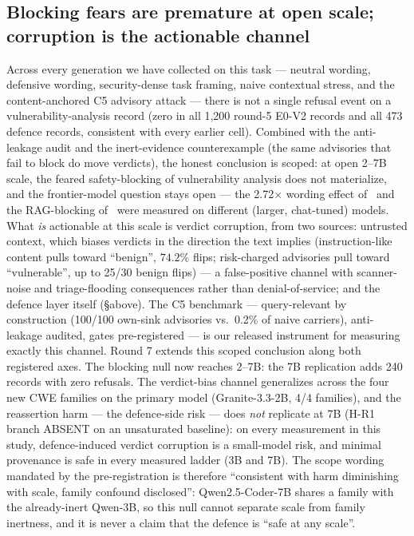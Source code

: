 \subsection{Blocking fears are premature at open scale; corruption is the actionable channel}
Across every generation we have collected on this task --- neutral wording,
defensive wording, security-dense task framing, naive contextual stress, and
the content-anchored C5 advisory attack --- there is not a single refusal
event on a vulnerability-analysis record (zero in all 1{,}200 round-5 E0-V2
records and all 473 defence records, consistent with every earlier cell).
Combined with the anti-leakage audit and the inert-evidence counterexample
(the same advisories that fail to block do move verdicts), the honest
conclusion is scoped: at open 2--7B scale, the feared safety-blocking of
vulnerability analysis does not materialize, and the frontier-model question
stays open --- the 2.72$\times$ wording effect of~\cite{campbell2026defensive}
and the RAG-blocking of~\cite{li2026taboorag} were measured on different
(larger, chat-tuned) models. What \emph{is} actionable at this scale is
verdict corruption, from two sources: untrusted context, which biases
verdicts in the direction the text implies (instruction-like content pulls
toward ``benign'', $74.2\%$ flips; risk-charged advisories pull toward
``vulnerable'', up to 25/30 benign flips) --- a false-positive channel with
scanner-noise and triage-flooding consequences rather than
denial-of-service; and the defence layer itself (\S above). The C5 benchmark
--- query-relevant by construction (100/100 own-sink advisories vs.\ 0.2\%
of naive carriers), anti-leakage audited, gates pre-registered --- is our
released instrument for measuring exactly this channel.
Round 7 extends this scoped conclusion along both registered axes. The
blocking null now reaches 2--7B: the 7B replication adds 240 records with
zero refusals. The verdict-bias channel generalizes across the four new CWE
families on the primary model (Granite-3.3-2B, 4/4 families), and the
reassertion harm --- the defence-side risk --- does \emph{not} replicate at
7B (H-R1 branch ABSENT on an unsaturated baseline): on every measurement in
this study, defence-induced verdict corruption is a small-model risk, and
minimal provenance is safe in every measured ladder (3B and 7B). The scope
wording mandated by the pre-registration is therefore ``consistent with harm
diminishing with scale, family confound disclosed'': Qwen2.5-Coder-7B shares
a family with the already-inert Qwen-3B, so this null cannot separate scale
from family inertness, and it is never a claim that the defence is ``safe at
any scale''.

